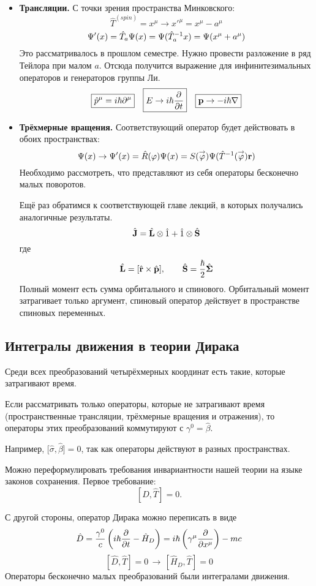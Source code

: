 \begin{itemize}
  \item \textbf{Трансляции.}  С точки зрения пространства Минковского:
$$
    \hat T^{(spin)} = x^{\mu} \to x'^{\mu} = x^{\mu} - a^{\mu}
$$
$$
    \Psi'(x) = \Hat T_a \Psi(x) = \Psi(\Hat T_a^{-1} x) = \Psi(x^{\mu} + a^{\mu})
$$
Это рассматривалось в прошлом семестре. Нужно провести разложение в ряд Тейлора при малом $a$. Отсюда получится выражение для инфинитезимальных операторов и генераторов группы Ли.
$$
    \boxed{
        \hat p^{\mu} = i \hbar \pd^{\mu}
    } \quad \boxed
    {
        E \to i \hbar \ud{}{t}
    } \quad \boxed{
        \bf p \to - i \hbar \nabla
    }
$$
  \item \textbf{Трёхмерные вращения.} Соответствующий оператор будет действовать в обоих пространствах:
  $$
    \Psi(x) \to \Psi'(x) = \hat R(\phi) \Psi(x) = S(\vec \phi) \Psi(\hat T^{-1} (\vec \phi) \bf r)
  $$
  Необходимо рассмотреть, что представляют из себя операторы бесконечно малых поворотов.
  
  Ещё раз обратимся к соответствующей главе лекций, в которых получались аналогичные результаты.
  $$
    \hat{\bf J} = \hat{\bf L} \otimes \hat 1 + \hat 1 \otimes \hat{\bf S}
  $$
  где
  $$
    \hat {\bf L} = [\hat {\bf r} \times \hat{\bf p}], \qquad \hat {\bf S} = \dfrac{\hbar}{2} \hat{\boldsymbol \Sigma}
  $$
  Полный момент есть сумма орбитального и спинового. Орбитальный момент затрагивает только аргумент, спиновый оператор действует в пространстве спиновых переменных.
\end{itemize}

\subsection{Интегралы движения в теории Дирака}

Среди всех преобразований четырёхмерных координат есть такие, которые затрагивают время.

Если рассматривать только операторы, которые не затрагивают время (пространственные трансляции, трёхмерные вращения и отражения), то операторы этих преобразований коммутируют с $\gamma^0 = \hat \beta$.

Например, [$\hat \sigma, \hat \beta] = 0$, так как операторы действуют в разных пространствах.

Можно переформулировать требования инвариантности нашей теории на языке законов сохранения.
Первое требование: 
$$
[\hat D, \hat T] = 0.
$$

С другой стороны, оператор Дирака можно переписать в виде
$$
    \Hat D = \dfrac{\gamma^0}{c} \left(
        i \hbar \dfrac{\pd}{\pd t} - \hat H_{D}
    \right) = i \hbar \left(
        \gamma^{\mu} \ud{}{x^{\mu}}
    \right) - mc
$$
$$
    [\hat D, \hat T] = 0 \, \to \, [\hat H_D, \hat T] = 0
$$
Операторы бесконечно малых преобразований были интегралами движения.

